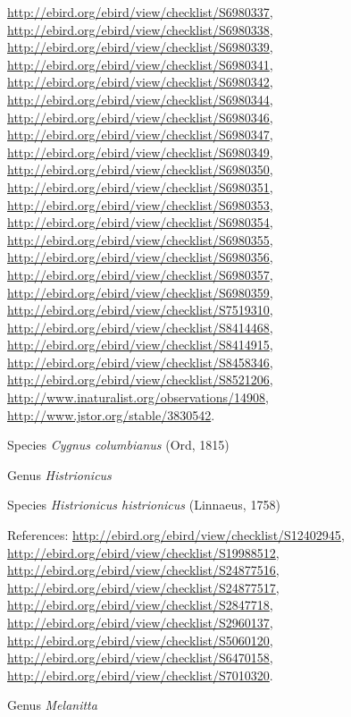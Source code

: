 \documentclass[9pt, article]{memoir}
\begin{document}
\begin{multicols}{2}
\url{http://ebird.org/ebird/view/checklist/S6980337}, 
\url{http://ebird.org/ebird/view/checklist/S6980338}, 
\url{http://ebird.org/ebird/view/checklist/S6980339}, 
\url{http://ebird.org/ebird/view/checklist/S6980341}, 
\url{http://ebird.org/ebird/view/checklist/S6980342}, 
\url{http://ebird.org/ebird/view/checklist/S6980344}, 
\url{http://ebird.org/ebird/view/checklist/S6980346}, 
\url{http://ebird.org/ebird/view/checklist/S6980347}, 
\url{http://ebird.org/ebird/view/checklist/S6980349}, 
\url{http://ebird.org/ebird/view/checklist/S6980350}, 
\url{http://ebird.org/ebird/view/checklist/S6980351}, 
\url{http://ebird.org/ebird/view/checklist/S6980353}, 
\url{http://ebird.org/ebird/view/checklist/S6980354}, 
\url{http://ebird.org/ebird/view/checklist/S6980355}, 
\url{http://ebird.org/ebird/view/checklist/S6980356}, 
\url{http://ebird.org/ebird/view/checklist/S6980357}, 
\url{http://ebird.org/ebird/view/checklist/S6980359}, 
\url{http://ebird.org/ebird/view/checklist/S7519310}, 
\url{http://ebird.org/ebird/view/checklist/S8414468}, 
\url{http://ebird.org/ebird/view/checklist/S8414915}, 
\url{http://ebird.org/ebird/view/checklist/S8458346}, 
\url{http://ebird.org/ebird/view/checklist/S8521206}, 
\url{http://www.inaturalist.org/observations/14908}, 
\url{http://www.jstor.org/stable/3830542}.

\vspace{6pt}\noindent\hspace{36pt}Species \textit{Cygnus columbianus} (Ord, 1815)


\vspace{6pt}\noindent\hspace{30pt}Genus \textit{Histrionicus}


\vspace{6pt}\noindent\hspace{36pt}Species \textit{Histrionicus histrionicus} (Linnaeus, 1758)


\vspace{6pt}References: 
\url{http://ebird.org/ebird/view/checklist/S12402945}, 
\url{http://ebird.org/ebird/view/checklist/S19988512}, 
\url{http://ebird.org/ebird/view/checklist/S24877516}, 
\url{http://ebird.org/ebird/view/checklist/S24877517}, 
\url{http://ebird.org/ebird/view/checklist/S2847718}, 
\url{http://ebird.org/ebird/view/checklist/S2960137}, 
\url{http://ebird.org/ebird/view/checklist/S5060120}, 
\url{http://ebird.org/ebird/view/checklist/S6470158}, 
\url{http://ebird.org/ebird/view/checklist/S7010320}.

\vspace{6pt}\noindent\hspace{30pt}Genus \textit{Melanitta}



\end{multicols}
\end{document}
